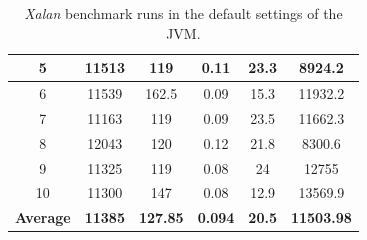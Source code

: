 \documentclass[
  digital, %
  oneside,
  notable, %
  nolof,     %
  nolot     %
]{fithesis3}
\begin{document}
\begin{table}[]
\begin{tabular}{|c|c|c|c|c|c|}
	5                & 11513                                                        & 119                                                                    & 0.11                                                                   & 23.3                                                                 & 8924.2                                                          \\ \hline
	6                & 11539                                                        & 162.5                                                                  & 0.09                                                                   & 15.3                                                                 & 11932.2                                                         \\ \hline
	7                & 11163                                                        & 119                                                                    & 0.09                                                                   & 23.5                                                                 & 11662.3                                                         \\ \hline
	8                & 12043                                                        & 120                                                                    & 0.12                                                                   & 21.8                                                                 & 8300.6                                                          \\ \hline
	9                & 11325                                                        & 119                                                                    & 0.08                                                                   & 24                                                                   & 12755                                                           \\ \hline
	10               & 11300                                                        & 147                                                                    & 0.08                                                                   & 12.9                                                                 & 13569.9                                                         \\ \hline
	\textbf{Average} & \textbf{11385}                                               & \textbf{127.85}                                                        & \textbf{0.094}                                                         & \textbf{20.5}                                                        & \textbf{11503.98}                                               \\ \hline
\end{tabular}
	\caption{\textit{Xalan} benchmark runs in the default settings of the JVM.}
	\label{default}
\end{table}
\end{document}
